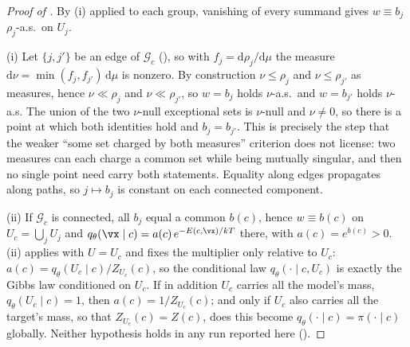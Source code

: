 \begin{proof}[Proof of ]
By (i) applied to each group, vanishing of every summand
gives $w \equiv b_j$ $\rho_j$-a.s.\ on $U_j$.

(i) Let $\{j,j'\}$ be an edge of $\mathcal{G}_c$ (), so with
$f_j = \mathrm{d}\rho_j/\mathrm{d}\mu$ the measure
$\mathrm{d}\nu = \min(f_j,f_{j'})\,\mathrm{d}\mu$ is nonzero. By construction
$\nu \le \rho_j$ and $\nu \le \rho_{j'}$ as measures, hence $\nu \ll \rho_j$ and
$\nu \ll \rho_{j'}$, so $w = b_j$ holds $\nu$-a.s.\ and $w = b_{j'}$ holds
$\nu$-a.s. The union of the two $\nu$-null exceptional sets is $\nu$-null and
$\nu \neq 0$, so there is a point at which both identities hold and
$b_j = b_{j'}$. This is precisely the step that the weaker ``some set charged by
both measures'' criterion does not license: two measures can each charge a common
set while being mutually singular, and then no single point need carry both
statements. Equality along edges propagates along paths, so $j \mapsto b_j$ is
constant on each connected component.

(ii) If $\mathcal{G}_c$ is connected, all $b_j$ equal a common $b(c)$, hence
$w \equiv b(c)$ on $U_c = \bigcup_j U_j$ and
$q_\theta(\vx\mid c) = a(c)\,e^{-E(c,\vx)/kT}$ there, with $a(c) = e^{b(c)} > 0$.
(ii) applies with $U = U_c$ and fixes the multiplier only
relative to $U_c$: $a(c) = q_\theta(U_c\mid c)/Z_{U_c}(c)$, so the conditional law
$q_\theta(\cdot \mid c, U_c)$ is exactly the Gibbs law conditioned on $U_c$. If in
addition $U_c$ carries all the model's mass, $q_\theta(U_c\mid c) = 1$, then
$a(c) = 1/Z_{U_c}(c)$; and only if $U_c$ also carries all the target's mass, so that
$Z_{U_c}(c) = Z(c)$, does this become $q_\theta(\cdot\mid c) = \pi(\cdot\mid c)$
globally. Neither hypothesis holds in any run reported here
().


\end{proof}
